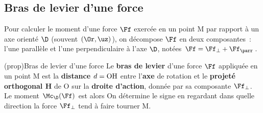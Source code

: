 \documentclass[../../main/main.tex]{subfiles}
\begin{document}
\subsection{Bras de levier d'une force}
Pour calculer le moment d'une force $\Ff$ exercée en un point M par rapport à un
axe orienté $\D$ (souvent $(\Or,\uz)$), on décompose $\Ff$ en deux composantes~:
l'une parallèle et l'une perpendiculaire à l'axe $\D$, notées $\Ff = \Ff_{\perp}
	+ \Ff_{\parr}$.
\begin{center}
\end{center}
\begin{tcb*}(prop){Bras de levier d'une force}
	Le \textbf{bras de levier} d'une force $\Ff$ appliquée en un point M est la
	\textbf{distance $d = \rm OH$} entre l'\textbf{axe} de rotation et le
	\textbf{projeté orthogonal H} de O sur la \textbf{droite d'action}, donnée par
	sa composante $\Ff_{\perp}$. Le moment $\Mc_{\D}(\Ff)$ est alors
	\psw{
		\[
			\boxed{
				\Mc_{\D}(\Ff) =
				\OMr \cdot \norm{\Ff_{\perp}} \sin(\a) =
				\pm d\norm{\Ff_{\perp}}
			}
		\]
	}
	On détermine le signe en regardant dans quelle direction la force
	$\Ff_{\perp}$ tend à faire tourner M.
\end{tcb*}
\end{document}
